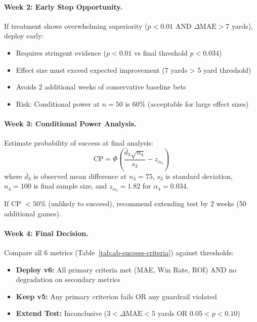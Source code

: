 \paragraph{Week 2: Early Stop Opportunity.}
If treatment shows overwhelming superiority ($p < 0.01$ AND $\Delta\text{MAE} > 7$ yards), deploy early:
\begin{itemize}[itemsep=2pt,parsep=0pt]
    \item Requires stringent evidence ($p < 0.01$ vs final threshold $p < 0.034$)
    \item Effect size must exceed expected improvement (7 yards > 5 yard threshold)
    \item Avoids 2 additional weeks of conservative baseline bets
    \item Risk: Conditional power at $n = 50$ is 60\% (acceptable for large effect sizes)
\end{itemize}

\paragraph{Week 3: Conditional Power Analysis.}
Estimate probability of success at final analysis:
\begin{equation}
\text{CP} = \Phi \left( \frac{\bar{d}_3 \sqrt{n_4}}{s_3} - z_{\alpha_4} \right)
\label{eq:conditional-power}
\end{equation}
where $\bar{d}_3$ is observed mean difference at $n_3 = 75$, $s_3$ is standard deviation, $n_4 = 100$ is final sample size, and $z_{\alpha_4} = 1.82$ for $\alpha_4 = 0.034$.

If CP $< 50\%$ (unlikely to succeed), recommend extending test by 2 weeks (50 additional games).

\paragraph{Week 4: Final Decision.}
Compare all 6 metrics (Table~\ref{tab:ab-success-criteria}) against thresholds:
\begin{itemize}[itemsep=2pt,parsep=0pt]
    \item \textbf{Deploy v6:} All primary criteria met (MAE, Win Rate, ROI) AND no degradation on secondary metrics
    \item \textbf{Keep v5:} Any primary criterion fails OR any guardrail violated
    \item \textbf{Extend Test:} Inconclusive ($3 < \Delta\text{MAE} < 5$ yards OR $0.05 < p < 0.10$)
\end{itemize}

